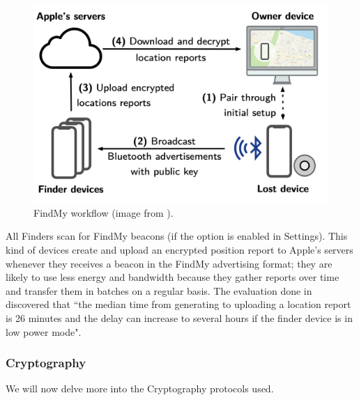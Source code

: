 \documentclass[english]{article}
\begin{document}
\begin{figure}[]
	\centering
	\includegraphics[width=.5\textwidth]{images/process.png}
	\caption{FindMy workflow (image from \cite{whocanfind}).}
	\label{process}
\end{figure}
All Finders scan for FindMy beacons (if the option is enabled in Settings).
This kind of devices create and upload an encrypted position report to Apple's servers whenever they receives a beacon in the FindMy advertising format; they are likely to use less energy and bandwidth because they gather reports over time and transfer them in batches on a regular basis. The evaluation done in \cite{whocanfind} discovered that ``the median time from generating to uploading a location report is 26 minutes and the delay can increase to several hours if the finder device is in low power mode".

\subsubsection{Cryptography} \label{sec:crypto}
We will now delve more into the Cryptography protocols used. 
\end{document}
